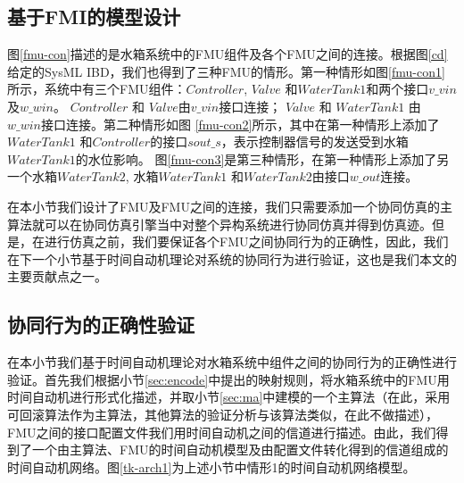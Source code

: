 \subsection{基于FMI的模型设计} 
\label{sec:case}
图\ref{fmu-con}描述的是水箱系统中的FMU组件及各个FMU之间的连接。根据图\ref{cd}给定的SysML IBD，我们也得到了三种FMU的情形。第一种情形如图\ref{fmu-con1}所示，系统中有三个FMU组件：$Controller$, $Valve$ 和$WaterTank1$和两个接口$v \_ vin$及$w \_ win$。 $Controller$ 和 $Valve$由$v \_ vin$接口连接； $Valve$ 和 $WaterTank1$ 由 $w \_ win$接口连接。第二种情形如图 \ref{fmu-con2}所示，其中在第一种情形上添加了$WaterTank1$ 和$Controller$的接口$sout \_ s$，表示控制器信号的发送受到水箱$WaterTank1$的水位影响。 图\ref{fmu-con3}是第三种情形，在第一种情形上添加了另一个水箱$WaterTank2$, 水箱$WaterTank1$ 和$WaterTank2$由接口$w \_ out$连接。 
\begin{figure}[htbp]
\end{figure}

在本小节我们设计了FMU及FMU之间的连接，我们只需要添加一个协同仿真的主算法就可以在协同仿真引擎当中对整个异构系统进行协同仿真并得到仿真迹。但是，在进行仿真之前，我们要保证各个FMU之间协同行为的正确性，因此，我们在下一个小节基于时间自动机理论对系统的协同行为进行验证，这也是我们本文的主要贡献点之一。
\subsection{协同行为的正确性验证} 
\label{sec:mauppaal}
在本小节我们基于时间自动机理论对水箱系统中组件之间的协同行为的正确性进行验证。首先我们根据小节\ref{sec:encode}中提出的映射规则，将水箱系统中的FMU用时间自动机进行形式化描述，并取小节\ref{sec:ma}中建模的一个主算法（在此，采用可回滚算法作为主算法，其他算法的验证分析与该算法类似，在此不做描述），FMU之间的接口配置文件我们用时间自动机之间的信道进行描述。由此，我们得到了一个由主算法、FMU的时间自动机模型及由配置文件转化得到的信道组成的时间自动机网络。图\ref{tk-arch1}为上述小节中情形1的时间自动机网络模型。

